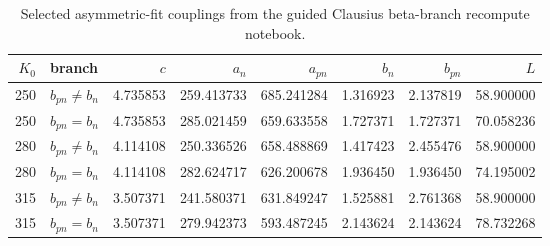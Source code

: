 \begin{table}[htbp]
        \centering
        \caption{Selected asymmetric-fit couplings from the guided Clausius beta-branch recompute notebook.}
        \label{tab:fit-selected}
        \begin{tabular}{r l r r r r r r}
        \toprule
        $K_0$ & branch & $c$ & $a_n$ & $a_{pn}$ & $b_n$ & $b_{pn}$ & $L$ \\
        \midrule
        250 & $b_{pn} \neq b_n$ & 4.735853 & 259.413733 & 685.241284 & 1.316923 & 2.137819 & 58.900000 \\
250 & $b_{pn} = b_n$ & 4.735853 & 285.021459 & 659.633558 & 1.727371 & 1.727371 & 70.058236 \\
280 & $b_{pn} \neq b_n$ & 4.114108 & 250.336526 & 658.488869 & 1.417423 & 2.455476 & 58.900000 \\
280 & $b_{pn} = b_n$ & 4.114108 & 282.624717 & 626.200678 & 1.936450 & 1.936450 & 74.195002 \\
315 & $b_{pn} \neq b_n$ & 3.507371 & 241.580371 & 631.849247 & 1.525881 & 2.761368 & 58.900000 \\
315 & $b_{pn} = b_n$ & 3.507371 & 279.942373 & 593.487245 & 2.143624 & 2.143624 & 78.732268 \\
        \bottomrule
        \end{tabular}
        \end{table}
